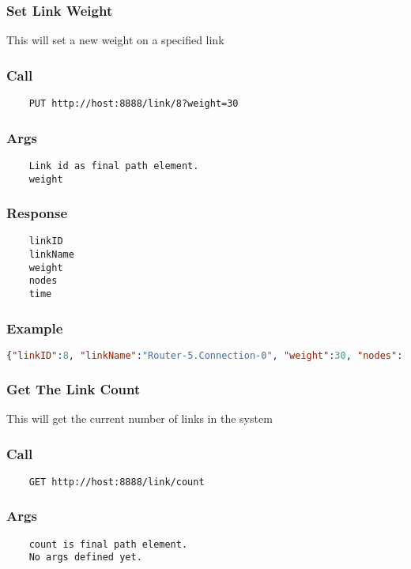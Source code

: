 \hr
\subsubsection{Set Link Weight}
This will set a new weight on a specified link
\subsubsection*{Call}
\begin{verbatim}
	PUT http://host:8888/link/8?weight=30
\end{verbatim}

\subsubsection*{Args}
\begin{verbatim}
	Link id as final path element.
	weight
\end{verbatim}

\subsubsection*{Response}
\begin{verbatim}
	linkID
	linkName
	weight
	nodes
	time
\end{verbatim}

\subsubsection*{Example}
\begin{lstlisting}[language=json]
{"linkID":8, "linkName":"Router-5.Connection-0", "weight":30, "nodes":[5,6], "time":1362079709109}
\end{lstlisting}


\hr
\subsubsection{Get The Link Count}
This will get the current number of links in the system
\subsubsection*{Call}
\begin{verbatim}
	GET http://host:8888/link/count
\end{verbatim}

\subsubsection*{Args}
\begin{verbatim}
	count is final path element.
	No args defined yet.
\end{verbatim}

